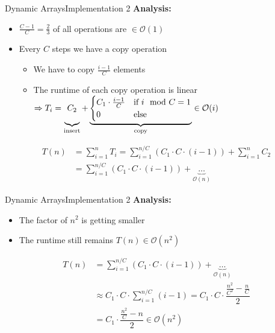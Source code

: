 \begin{frame}{Dynamic Arrays}{Implementation 2}
  \textbf{Analysis:}
  \begin{itemize}
    \item
      $\frac{C - 1}{C} = \frac{2}{3}$ of all operations are $\in \mathcal{O}(1)$
    \item
      Every $C$ steps we have a copy operation
    \begin{itemize}
      \item
        We have to copy $\frac{i- 1}{C}$ elements
      \item
        The runtime of each copy operation is linear\\
        $\Rightarrow T_i =
          \underbrace{
            C_2\vphantom{\begin{cases}C_1\\0\end{cases}}
          }_\text{insert}
          + \underbrace{\begin{cases}
            C_1 \cdot \frac{i - 1}{C} & \text{if } i \mod C = 1\\
            0 & \text{else}
            \end{cases}}_\text{copy}
          \in \mathcal{O}(i)$
    \end{itemize}
  \end{itemize}
  \begin{align*}
    T(n)
      &= \sum_{i=1}^{n} T_i
      = \sum_{i=1}^{n/C} \left(C_1 \cdot C \cdot (i-1) \right)
        + \sum_{i=1}^n C_2\\
      &= \sum_{i=1}^{n/C} \left(C_1 \cdot C \cdot (i-1) \right)
        + \underbrace{\dots}_{\mathcal{O}(n)}
  \end{align*}
\end{frame}


\begin{frame}{Dynamic Arrays}{Implementation 2}
  \textbf{Analysis:}
  \begin{itemize}
    \item
      The factor of $n^2$ is getting smaller
    \item
      The runtime still remains $T(n) \in \mathcal{O}(n^2)$
  \end{itemize}
  \begin{align*}%
    T(n)
      &= \sum_{i=1}^{n/C} \left(C_1 \cdot C \cdot (i-1) \right)
        + \underbrace{\dots}_{\mathcal{O}(n)}\\
    {} &\approx C_1 \cdot C \cdot \sum_{i=1}^{n/C} (i-1)
    = C_1 \cdot C \cdot \dfrac{\frac{n^2}{C^2}-\frac{n}{C}}{2}\\
    {} &= C_1 \cdot \dfrac{\frac{n^2}{C}-n}{2}
    \in \mathcal{O}(n^2)
  \end{align*}
\end{frame}

